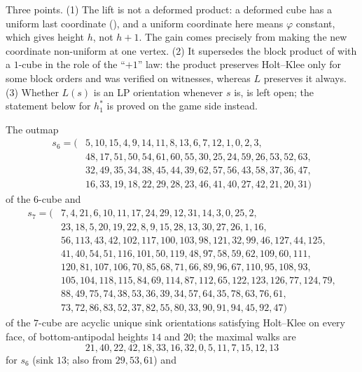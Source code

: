 \begin{remark}\label{hkd:rem-plus-one}
Three points. (1) The lift is not a deformed product: a deformed cube has
a uniform last coordinate (), and a uniform
coordinate here means $\varphi$ constant, which gives height $h$, not
$h+1$. The gain comes precisely from making the new coordinate
non-uniform at one vertex. (2) It supersedes the block product of
 with a $1$-cube in the role of the ``$+1$'' law:
the product preserves Holt--Klee only for some block orders and was
verified on witnesses, whereas $L$ preserves it always. (3) Whether $L(s)$
is an LP orientation whenever $s$ is, is left open; the statement below
for $h^{\ast}_1$ is proved on the game side instead.
\end{remark}

\begin{proposition}\label{hkd:records}
The outmap
\[
\begin{aligned}
 s_6=(&5,10,15,4,9,14,11,8,13,6,7,12,1,0,2,3,\\
      &48,17,51,50,54,61,60,55,30,25,24,59,26,53,52,63,\\
      &32,49,35,34,38,45,44,39,62,57,56,43,58,37,36,47,\\
      &16,33,19,18,22,29,28,23,46,41,40,27,42,21,20,31)
\end{aligned}
\]
of the $6$-cube and
\[
\begin{aligned}
 s_7=(&7,4,21,6,10,11,17,24,29,12,31,14,3,0,25,2,\\
      &23,18,5,20,19,22,8,9,15,28,13,30,27,26,1,16,\\
      &56,113,43,42,102,117,100,103,98,121,32,99,46,127,44,125,\\
      &41,40,54,51,116,101,50,119,48,97,58,59,62,109,60,111,\\
      &120,81,107,106,70,85,68,71,66,89,96,67,110,95,108,93,\\
      &105,104,118,115,84,69,114,87,112,65,122,123,126,77,124,79,\\
      &88,49,75,74,38,53,36,39,34,57,64,35,78,63,76,61,\\
      &73,72,86,83,52,37,82,55,80,33,90,91,94,45,92,47)
\end{aligned}
\]
of the $7$-cube are acyclic unique sink orientations satisfying Holt--Klee
on every face, of bottom-antipodal heights $14$ and $20$; the maximal
walks are
\[
 21,40,22,42,18,33,16,32,0,5,11,7,15,12,13
\]
for $s_6$ (sink $13$; also from $29,53,61$) and

\end{proposition}
